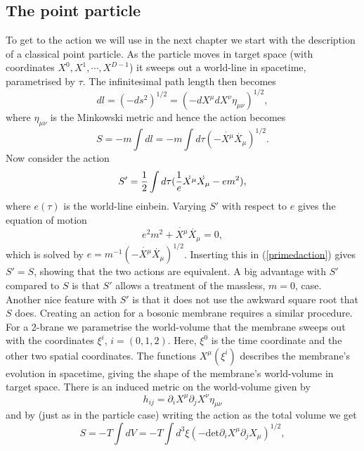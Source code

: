 \subsection{The point particle}
To get to the action we will use in the next chapter we start with the 
description of a classical point particle. As the particle moves in target space (with coordinates $X^0, X^1, \cdots, X^{D-1}$) 
it sweeps out a world-line in spacetime, parametrised by $\tau$. The infinitesimal path length then becomes
\begin{equation}
dl=(-ds^2)^{1/2}=(-dX^{\mu}dX^{\nu}\eta_{\mu \nu})^{1/2},
\end{equation}
where $\eta_{\mu \nu}$ is the Minkowski metric and hence the action becomes
\begin{equation}
S=-m\int dl=-m\int d\tau (-\dot{X^{\mu}}\dot{X_{\mu}})^{1/2}.
\end{equation}
Now consider the action
\begin{equation}
S'={1 \over 2}\int d\tau ({1 \over e}\dot{X^{\mu}}\dot{X_{\mu}} - e m^2),
\label{primedaction}
\end{equation}
where $e(\tau)$ is the world-line einbein. Varying $S'$ with respect to $e$ gives the equation of motion
\begin{equation}
e^2 m^2 + \dot{X^{\mu}}\dot{X_{\mu}} = 0,
\label{particleeom}
\end{equation}
which is solved by $e = m^{-1} (-\dot{X^{\mu}}\dot{X_{\mu}})^{1/2}$. Inserting this in (\ref{primedaction}) gives $S'=S$, showing that the two actions are equivalent. 
A big advantage with $S'$ compared to $S$ is that $S'$ allows a treatment of the massless, $m=0$, case. 
Another nice feature with $S'$ is that it does not use the awkward square root that $S$ does. \newline Creating an action 
for a bosonic membrane requires a similar procedure. For a 2-brane we parametrise the world-volume that the membrane sweeps out 
with the coordinates $\xi^i$, $i=(0,1,2)$. Here, $\xi^0$ is the time coordinate and the other two spatial coordinates.
The functions $X^{\mu}(\xi^i)$ describes the membrane's evolution in spacetime, giving the shape of the membrane's world-volume in target space.
There is an induced metric on the world-volume given by
\begin{equation}
h_{ij}=\partial_i X^{\mu} \partial_j X^{\nu} \eta_{\mu \nu}
\end{equation}
and by (just as in the particle case) writing the action as the total volume we get
\begin{equation}
S=-T\int dV = -T\int d^3 \xi (-\mbox{det}\partial_i X^{\mu} \partial_j X_{\mu})^{1/2},
\label{nambugoto}
\end{equation}
